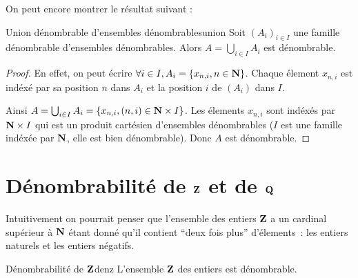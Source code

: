 \documentclass[a4paper,french,final]{memoir}
\begin{document}
On peut encore montrer le résultat suivant :
\begin{theoremb}{Union dénombrable d'ensembles dénombrables}{union}
    Soit $(A_i)_{i \in I}$ une famille dénombrable d'ensembles dénombrables.
	Alors $A= \bigcup_{i \in I} A_i$ est dénombrable.
\end{theoremb}
\begin{proof}
	En effet, on peut écrire $\forall i \in I, A_i = \{x_{n,i}, n \in \mathbf{N}\}$. Chaque élement $x_{n, i}$ est indéxé par sa position $n$ dans $A_i$ et la position $i$ de $(A_i)$ dans $I$.

	Ainsi $A = \bigcup_{i \in I} A_i = \{x_{n, i}, (n,i) \in \mathbf{N} \times I\}$. Les élements $x_{n,i}$ sont indéxés par $\mathbf{N} \times I$ qui est un produit cartésien d'ensembles dénombrables ($I$ est une famille indéxée par $\mathbf{N}$, elle est bien dénombrable). Donc $A$ est dénombrable.
\end{proof}
\section{\texorpdfstring{Dénombrabilité de $\mathbf{Z}$ et de $\mathbf{Q}$}{Dénombrabilité de Z et Q}}

Intuitivement on pourrait penser que l'ensemble des entiers $\mathbf{Z}$ a un cardinal supérieur à $\mathbf{N}$ étant donné qu'il contient \enquote{deux fois plus} d'élements~: les entiers naturels et les entiers négatifs.

\begin{theoremb}{Dénombrabilité de $\mathbf{Z}$}{denz}
	L'ensemble $\mathbf{Z}$ des entiers est dénombrable.
\end{theoremb}
\end{document}
